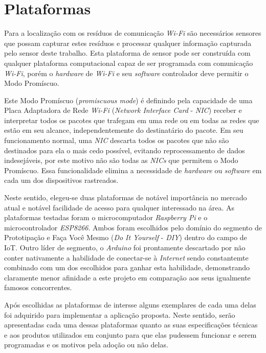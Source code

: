 \chapter{Plataformas}
\label{chap:Plataformas}

Para a localização com os resíduos de comunicação \emph{Wi-Fi} são necessários
sensores que possam capturar estes resíduos e processar qualquer informação
capturada pelo sensor deste trabalho. Esta plataforma de sensor pode ser construída com
qualquer plataforma computacional capaz de ser programada com comunicação
\emph{Wi-Fi}, porém o \emph{hardware} de \emph{Wi-Fi} e seu \emph{software}
controlador deve permitir o Modo Promíscuo.

Este Modo Promíscuo (\emph{promiscuous mode}) é definindo pela capacidade de uma
Placa Adaptadora de Rede \emph{Wi-Fi} (\emph{Network Interface Card} -
\emph{NIC}) receber e interpretar todos os pacotes que trafegam em uma rede ou
em todas as redes que estão em seu alcance, independentemente do destinatário do
pacote. Em seu funcionamento normal, uma \emph{NIC} descarta todos os pacotes que
não são destinados para ela o mais cedo possível, evitando reprocessamento de
dados indesejáveis, por este motivo não são todas as \emph{NICs} que permitem o
Modo Promíscuo. Essa funcionalidade elimina a necessidade de \emph{hardware} ou
\emph{software} em cada um dos dispositivos rastreados.

Neste sentido, elegeu-se duas plataformas de notável importância no mercado atual
e notável facilidade de acesso para qualquer interessado na área. As plataformas
testadas foram o microcomputador \emph{Raspberry Pi} e o microcontrolador
\emph{ESP8266}. Ambos  foram escolhidos pelo domínio do segmento de Prototipação
e Faça Você Mesmo  (\emph{Do It Yourself} - \emph{DIY}) dentro do campo de IoT.
Outro líder de segmento, o \emph{Arduino}  foi prontamente descartado por não
conter nativamente a habilidade de conectar-se à \emph{Internet} sendo
constantemte combinado com um dos escolhidos para ganhar esta habilidade,
demonstrando claramente menor afinidade a este projeto em comparação aos seus
igualmente famosos concorrentes.

Após escolhidas as plataformas de intersse alguns exemplares de cada uma delas
foi adquirido para implementar a aplicação proposta. Neste sentido, serão
apresentadas cada uma dessas plataformas quanto as suas especificações técnicas
e aos produtos utilizados em conjunto para que elas pudessem funcionar e serem
programadas e os motivos pela adoção ou não delas.


